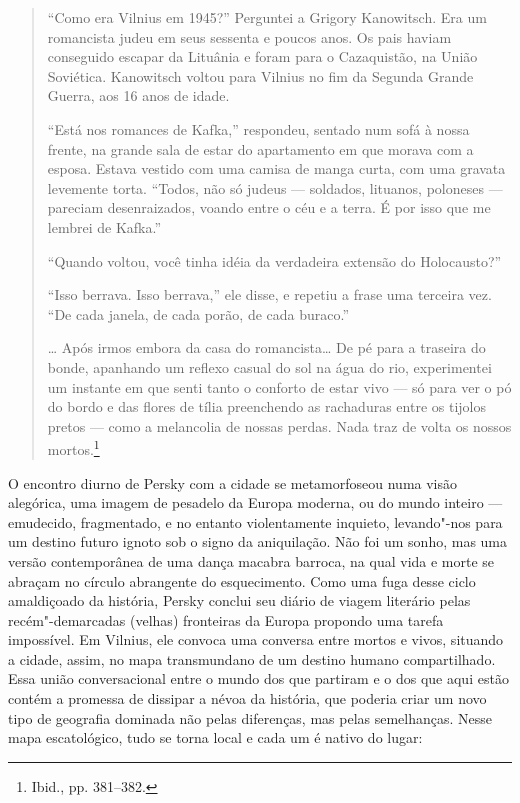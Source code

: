 \begin{quote}
``Como era Vilnius em 1945?'' Perguntei a Grigory Kanowitsch. Era um
romancista judeu em seus sessenta e poucos anos. Os pais haviam
conseguido escapar da Lituânia e foram para o Cazaquistão, na União
Soviética. Kanowitsch voltou para Vilnius no fim da Segunda Grande
Guerra, aos 16 anos de idade.

``Está nos romances de Kafka,'' respondeu, sentado num sofá à nossa
frente, na grande sala de estar do apartamento em que morava com a
esposa. Estava vestido com uma camisa de manga curta, com uma gravata
levemente torta. ``Todos, não só judeus --- soldados, lituanos, poloneses
--- pareciam desenraizados, voando entre o céu e a terra. É por isso que
me lembrei de Kafka.''

``Quando voltou, você tinha idéia da verdadeira extensão do
Holocausto?''

``Isso berrava. Isso berrava,'' ele disse, e repetiu a frase uma
terceira vez. ``De cada janela, de cada porão, de cada buraco.''

\ldots{} Após irmos embora da casa do romancista\ldots{} De pé para a
traseira do bonde, apanhando um reflexo casual do sol na água do rio,
experimentei um instante em que senti tanto o conforto de estar vivo ---
só para ver o pó do bordo e das flores de tília preenchendo as
rachaduras entre os tijolos pretos --- como a melancolia de nossas perdas.
Nada traz de volta os nossos mortos.\footnote{Ibid., pp. 381--382.}
\end{quote}

O encontro diurno de Persky com a cidade se metamorfoseou numa visão
alegórica, uma imagem de pesadelo da Europa moderna, ou do mundo inteiro
--- emudecido, fragmentado, e no entanto violentamente inquieto,
levando"-nos para um destino futuro ignoto sob o signo da aniquilação.
Não foi um sonho, mas uma versão contemporânea de uma dança macabra
barroca, na qual vida e morte se abraçam no círculo abrangente do
esquecimento. Como uma fuga desse ciclo amaldiçoado da história, Persky
conclui seu diário de viagem literário pelas recém"-demarcadas (velhas)
fronteiras da Europa propondo uma tarefa impossível. Em Vilnius, ele
convoca uma conversa entre mortos e vivos, situando a cidade, assim, no
mapa transmundano de um destino humano compartilhado. Essa união
conversacional entre o mundo dos que partiram e o dos que aqui estão
contém a promessa de dissipar a névoa da história, que poderia criar um
novo tipo de geografia dominada não pelas diferenças, mas pelas
semelhanças. Nesse mapa escatológico, tudo se torna local e cada um é
nativo do lugar:


